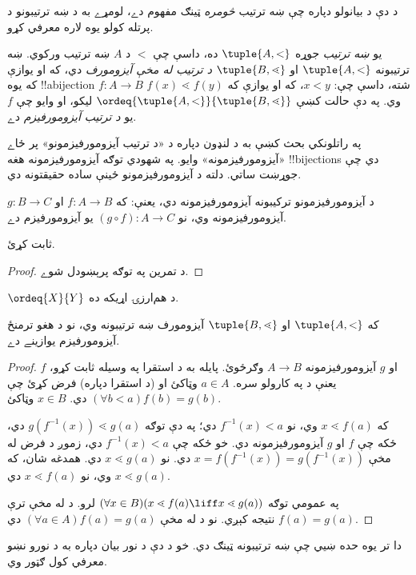 \documentclass[../../../include/open-logic-section]{subfiles}
\begin{document}

د دې د بيانولو دپاره چې ښه ترتيب \emph{څومره} ټينګ مفهوم دے،
لومړے به د ښه ترتيبونو د پرتله کولو يوه لاره معرفي کړو.

\begin{defn}
يو \emph{ښه ترتيب} جوړه $\tuple{A, <}$ ده، داسې چې $<$ د $A$
ښه ترتيب ورکوي. ښه ترتيبونه $\tuple{A, <}$ او $\tuple{B,
\lessdot}$ \emph{د ترتيب له مخې آيزومورف} دي، {که او يوازې که}
يوه !!a{bijection} $f \colon A \to B$ شته، داسې چې:
$x < y$، که او يوازې که $f(x) \lessdot  f(y)$ وي.
په دې حالت کښې $\ordeq{\tuple{A, <}}{\tuple{B, \lessdot}}$ ليکو،
او وايو چې $f$ يو \emph{د ترتيب آيزومورفيزم} دے.
\end{defn}
\noindent
په راتلونکي بحث کښې به د لنډون دپاره د «د ترتيب آيزومورفيزمونو»
پر ځاے «آيزومورفيزمونه» وايو. په شهودي توګه آيزومورفيزمونه
هغه !!{bijection}s دي چې جوړښت ساتي. دلته د آيزومورفيزمونو ځينې ساده حقيقتونه دي.

\begin{lem}
د آيزومورفيزمونو ترکيبونه آيزومورفيزمونه دي، يعنې: که
$f \colon A \to B$ او $g \colon B \to C$ آيزومورفيزمونه وي، نو
$(g \circ f)\colon A \to C$ يو آيزومورفيزم دے.
\end{lem}
\begin{prob}
	 ثابت کړئ.
\end{prob}
\begin{proof}
د تمرين په توګه پرېښودل شوے.
\end{proof}
\begin{cor}
	$\ordeq{X}{Y}$ د هم‌ارزۍ اړيکه ده.
\end{cor}
\begin{prop}
که $\tuple{A, <}$ او $\tuple{B, \lessdot}$ آيزومورف ښه ترتيبونه
وي، نو د هغو ترمنځ آيزومورفيزم يوازينے دے.
\end{prop}

\begin{proof}
$f$ او $g$ آيزومورفيزمونه $A \to B$ وګرځوئ. پايله به د
استقرا په وسيله ثابت کړو، يعنې د  په کارولو سره.
$a\in A$ وټاکئ او (د استقرا دپاره) فرض کړئ چې
$(\forall b < a)f(b) = g(b)$ دي. $x \in B$ وټاکئ.

که $x \lessdot f(a)$ وي، نو $f^{-1}(x) < a$ دي؛ په دې توګه
$g(f^{-1}(x)) \lessdot g(a)$ دي، ځکه چې $f$ او $g$
آيزومورفيزمونه دي. خو ځکه چې $f^{-1}(x) < a$ دي، زموږ د فرض
له مخې $x =f(f^{-1}(x)) = g(f^{-1}(x))$ دي.
نو $x \lessdot g(a)$ دي. همدغه شان، که $x \lessdot g(a)$ وي،
نو $x \lessdot f(a)$ دي.

په عمومي توګه $(\forall x \in B)(x \lessdot f(a) \liff x \lessdot
g(a))$ لرو. د 
له مخې ترې $f(a) = g(a)$ نتيجه کېږي. نو د
 له مخې $(\forall a \in A)f(a) = g(a)$ دي.
\end{proof}\noindent
دا تر يوه حده ښيي چې ښه ترتيبونه ټينګ دي. خو د دې د نور بيان
دپاره به د نورو نښو معرفي کول ګټور وي.
\end{document}

